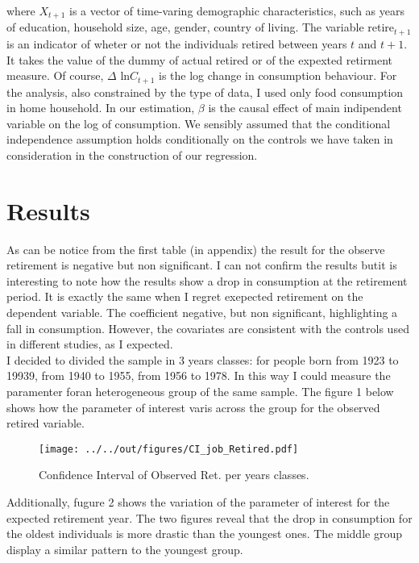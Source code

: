 \documentclass[11pt, a4paper, leqno]{article}
\begin{document}
where $X_{t+1}$ is a vector of time-varing demographic characteristics, such as years of education, household size, age, gender, country of living. The variable retire$_{t+1}$ is an indicator of wheter or not the individuals retired between years $t$ and $t+1$. It takes the value of the dummy of actual retired or of the expexted retirment measure. Of course, $\Delta$ ln$C_{t+1}$ is the log change in consumption behaviour. For the analysis, also constrained by the type of data, I used only food consumption in home household. In our estimation, $\beta$ is the causal effect of main indipendent variable on the log of consumption. We sensibly assumed that the conditional independence assumption holds conditionally on the controls we have taken in consideration in the construction of our regression.

\section{Results}
\label{sec:results}

As can be notice from the first table (in appendix) the result for the observe retirement is negative but non significant. I can not confirm the results butit is interesting to note how the results show a drop in consumption at the retirement period. It is exactly the same when I regret exepected retirement on the dependent variable. The coefficient negative, but non significant, highlighting a fall in consumption. However, the covariates are consistent with the controls used in different studies, as I expected.
\\\hspace*{4mm} I decided to divided the sample in 3 years classes: for people born from 1923 to 19939, from 1940 to 1955, from 1956 to 1978. In this way I could measure the paramenter foran  heterogeneous group of the same sample. The figure 1  below shows how the parameter of interest varis across the group for the observed retired variable.
\begin{figure}[h]
\centering
\texttt{[image: ../../out/figures/CI\_job\_Retired.pdf]}
\caption{Confidence Interval of Observed Ret. per years classes.}
\end{figure}

Additionally, fugure 2 shows the variation of the parameter of interest for the expected retirement year. The two figures reveal that the drop in consumption for the oldest individuals is more drastic than the youngest ones. The middle group display a similar pattern to the youngest group.
\end{document}

